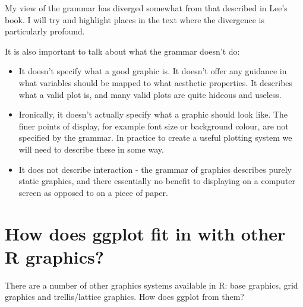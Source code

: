 My view of the grammar has diverged somewhat from that described in Lee's book.  I will try and highlight places in the text where the divergence is particularly profound.

It is also important to talk about what the grammar doesn't do:

\begin{itemize}
	\item It doesn't specify what a good graphic is.  It doesn't offer any guidance in what variables should be mapped to what aesthetic properties.  It describes what a valid plot is, and many valid plots are quite hideous and useless.

	\item Ironically, it doesn't actually specify what a graphic should look like.  The finer points of display, for example font size or background colour, are not specified by the grammar.  In practice to create a useful plotting system we will need to describe these in some way.

	\item It does not describe interaction - the grammar of graphics describes purely static graphics, and there essentially no benefit to displaying on a computer screen as opposed to on a piece of paper.
\end{itemize}

\section{How does ggplot fit in with other R graphics?}

There are a number of other graphics systems available in R: base graphics, grid graphics and trellis/lattice graphics.  How does ggplot from them?

